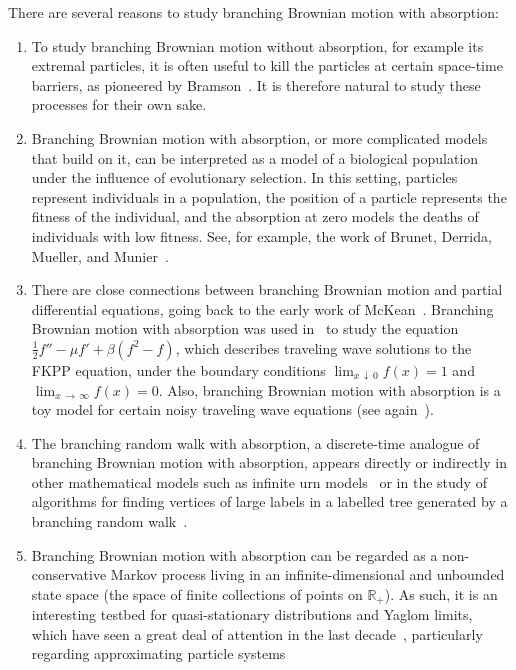 \documentclass[AHL,Unicode,longabstracts,published]{cedram}
\newcommand*\R{\mathbb{R}}
\newcommand{\1} {\mathds{1}}
\begin{document}
There are several reasons to study branching Brownian motion with absorption:
\begin{enumerate}
\item To study branching Brownian motion without absorption, for example its extremal particles, it is often useful to kill the particles at certain space-time barriers, as pioneered by Bramson~\cite{Bramson1978}. It is therefore natural to study these processes for their own sake.

\item Branching Brownian motion with absorption, or more complicated models that build on it, can be interpreted as a model of a biological population under the influence of evolutionary selection. In this setting, particles represent individuals in a population, the position of a particle represents the fitness of the individual, and the absorption at zero models the deaths of individuals with low fitness. See, for example, the work of Brunet, Derrida, Mueller, and Munier~\cite{bdmm1, bdmm2}.

\item There are close connections between branching Brownian motion and partial differential equations, going back to the early work of McKean~\cite{mckean}. Branching Brownian motion with absorption was used in~\cite{hhk06} to study the equation $\frac{1}{2} f'' - \mu f' + \beta (f^2 - f)$, which describes traveling wave solutions to the FKPP equation, under the boundary conditions $\lim_{x\,\downarrow\,0} f(x) = 1$ and $\lim_{x\,\rightarrow\,\infty} f(x) = 0$. Also, branching Brownian motion with absorption is a toy model for certain noisy traveling wave equations (see again~\cite{bdmm1,bdmm2}).

\item The branching random walk with absorption, a discrete-time analogue of branching Brownian motion with absorption, appears directly or indirectly in other mathematical models such as infinite urn models~\cite{mr2016} or in the study of algorithms for finding vertices of large labels in a labelled tree generated by a branching random walk~\cite{Aldous1992}.

\item Branching Brownian motion with absorption can be regarded as a non-conservative Markov process living in an infinite-dimensional and unbounded state space (the space of finite collections of points on $\R_+$). As such, it is an interesting testbed for quasi-stationary distributions and Yaglom limits, which have seen a great deal of attention in the last decade~\cite{cclmms,cv16,mv12}, particularly regarding approximating particle systems~\cite{afgj,delmoral}
\end{enumerate}
\end{document}
